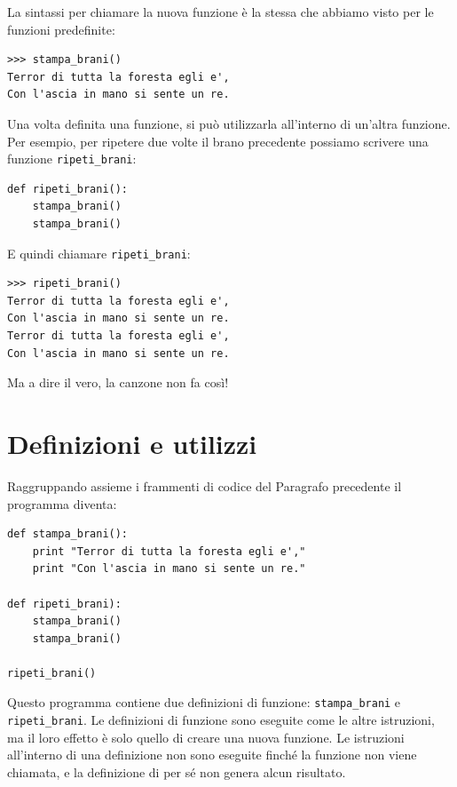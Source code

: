 \documentclass[10pt]{book}
\begin{document}
La sintassi per chiamare la nuova funzione è la stessa che abbiamo visto per le funzioni predefinite:

\begin{verbatim}
>>> stampa_brani()
Terror di tutta la foresta egli e',
Con l'ascia in mano si sente un re.
\end{verbatim}
%
Una volta definita una funzione, si può utilizzarla all'interno di un'altra funzione. Per esempio, per ripetere due volte il brano precedente possiamo scrivere una funzione \verb"ripeti_brani":

\begin{verbatim}
def ripeti_brani():
    stampa_brani()
    stampa_brani()
\end{verbatim}
%
E quindi chiamare \verb"ripeti_brani":

\begin{verbatim}
>>> ripeti_brani()
Terror di tutta la foresta egli e',
Con l'ascia in mano si sente un re.
Terror di tutta la foresta egli e',
Con l'ascia in mano si sente un re.
\end{verbatim}
%
Ma a dire il vero, la canzone non fa così!


\section{Definizioni e utilizzi}

Raggruppando assieme i frammenti di codice del Paragrafo precedente il programma diventa:

\begin{verbatim}
def stampa_brani():
    print "Terror di tutta la foresta egli e',"
    print "Con l'ascia in mano si sente un re."

def ripeti_brani):
    stampa_brani()
    stampa_brani()

ripeti_brani()
\end{verbatim}
%
Questo programma contiene due definizioni di funzione: \verb"stampa_brani" e
\verb"ripeti_brani".  Le definizioni di funzione sono eseguite come le altre istruzioni, ma il loro effetto è solo quello di creare una nuova funzione. Le istruzioni all'interno di una definizione non sono eseguite finché la funzione non viene chiamata, e la definizione di per sé non genera alcun risultato.
\end{document}
